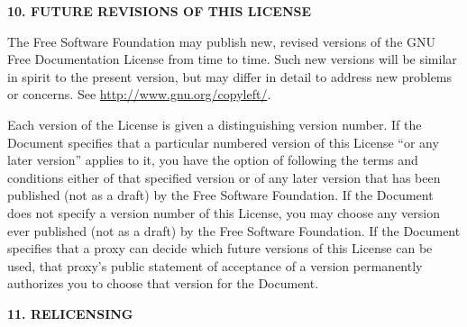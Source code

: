 \fi

\ifdefined\eng
\fi

\ifdefined\chs

\fi

\ifdefined\eng
\begin{center}
{\Large\bf 10. FUTURE REVISIONS OF THIS LICENSE\par}
\end{center}
\fi

\ifdefined\chs

\fi

\ifdefined\eng
\fi

\ifdefined\chs

\fi

\ifdefined\eng
The Free Software Foundation may publish new, revised versions
of the GNU Free Documentation License from time to time.  Such new
versions will be similar in spirit to the present version, but may
differ in detail to address new problems or concerns.  See
\url{http://www.gnu.org/copyleft/}.
\fi

\ifdefined\chs

\fi

\ifdefined\eng
Each version of the License is given a distinguishing version number.
If the Document specifies that a particular numbered version of this
License ``or any later version'' applies to it, you have the option of
following the terms and conditions either of that specified version or
of any later version that has been published (not as a draft) by the
Free Software Foundation.  If the Document does not specify a version
number of this License, you may choose any version ever published (not
as a draft) by the Free Software Foundation.  If the Document
specifies that a proxy can decide which future versions of this
License can be used, that proxy's public statement of acceptance of a
version permanently authorizes you to choose that version for the
Document.
\fi

\ifdefined\chs

\fi

\ifdefined\eng
\fi

\ifdefined\chs

\fi

\ifdefined\eng
\begin{center}
{\Large\bf 11. RELICENSING\par}
\end{center}
\fi

\ifdefined\chs

\fi


